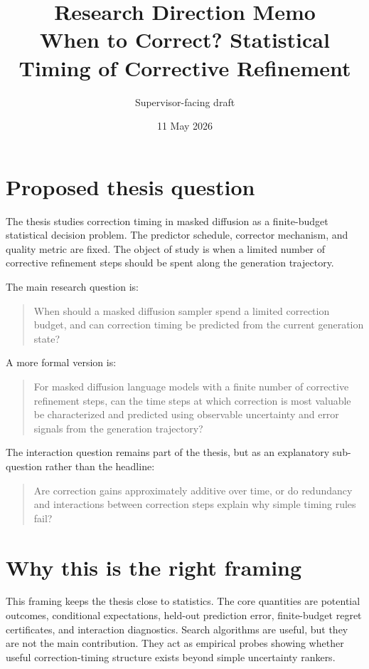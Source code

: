\documentclass[11pt]{article}
\title{\vspace{-1.5em}Research Direction Memo\\
\large When to Correct? Statistical Timing of Corrective Refinement}
\author{Supervisor-facing draft}
\date{11 May 2026}
\begin{document}
\maketitle

\vspace{-1.0em}
\section*{Proposed thesis question}

The thesis studies correction timing in masked diffusion as a finite-budget
statistical decision problem.  The predictor schedule, corrector mechanism,
and quality metric are fixed.  The object of study is when a limited number of
corrective refinement steps should be spent along the generation trajectory.

\medskip
\noindent
The main research question is:

\begin{quote}
When should a masked diffusion sampler spend a limited correction budget, and
can correction timing be predicted from the current generation state?
\end{quote}

\noindent
A more formal version is:

\begin{quote}
For masked diffusion language models with a finite number of corrective
refinement steps, can the time steps at which correction is most valuable be
characterized and predicted using observable uncertainty and error signals
from the generation trajectory?
\end{quote}

\noindent
The interaction question remains part of the thesis, but as an explanatory
sub-question rather than the headline:

\begin{quote}
Are correction gains approximately additive over time, or do redundancy and
interactions between correction steps explain why simple timing rules fail?
\end{quote}

\section*{Why this is the right framing}

This framing keeps the thesis close to statistics.  The core quantities are
potential outcomes, conditional expectations, held-out prediction error,
finite-budget regret certificates, and interaction diagnostics.  Search
algorithms are useful, but they are not the main contribution.  They act as
empirical probes showing whether useful correction-timing structure exists
beyond simple uncertainty rankers.
\end{document}
